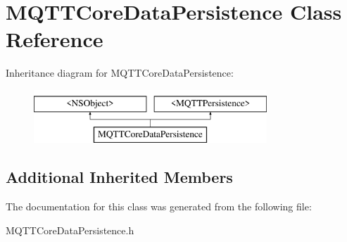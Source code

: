 \hypertarget{interface_m_q_t_t_core_data_persistence}{}\section{M\+Q\+T\+T\+Core\+Data\+Persistence Class Reference}
\label{interface_m_q_t_t_core_data_persistence}
Inheritance diagram for M\+Q\+T\+T\+Core\+Data\+Persistence\+:\begin{figure}[H]
\begin{center}
\leavevmode
\includegraphics[height=2.000000cm]{interface_m_q_t_t_core_data_persistence}
\end{center}
\end{figure}
\subsection*{Additional Inherited Members}


The documentation for this class was generated from the following file\+:\begin{DoxyCompactItemize}
\item 
M\+Q\+T\+T\+Core\+Data\+Persistence.\+h\end{DoxyCompactItemize}
